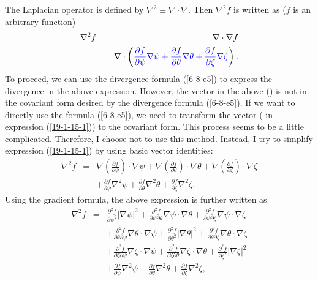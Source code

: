 \documentclass{article}
\newcommand{\tmcolor}[2]{{\color{#1}{#2}}}
\begin{document}
The Laplacian operator is defined by $\nabla^2 \equiv \nabla \cdot \nabla$.
Then $\nabla^2 f$ is written as ($f$ is an arbitrary function)
\begin{eqnarray}
  \nabla^2 f & = & \nabla \cdot \nabla f \nonumber\\
  & = & \nabla \cdot \left( \tmcolor{blue}{\frac{\partial f}{\partial \psi}
  \nabla \psi + \frac{\partial f}{\partial \theta} \nabla \theta +
  \frac{\partial f}{\partial \zeta} \nabla \zeta} \right) .  \label{19-1-15-1}
\end{eqnarray}
To proceed, we can use the divergence formula (\ref{6-8-e5}) to express the
divergence in the above expression. However, the vector in the above
(\tmcolor{blue}{blue term}) is not in the covariant form desired by the
divergence formula (\ref{6-8-e5}). If we want to directly use the formula
(\ref{6-8-e5}), we need to transform the vector (\tmcolor{blue}{blue term} in
expression (\ref{19-1-15-1})) to the covariant form. This process seems to be
a little complicated. Therefore, I choose not to use this method. Instead, I
try to simplify expression (\ref{19-1-15-1}) by using basic vector identities:
\begin{eqnarray}
  \nabla^2 f & = & \nabla \left( \frac{\partial f}{\partial \psi} \right)
  \cdot \nabla \psi + \nabla \left( \frac{\partial f}{\partial \theta} \right)
  \cdot \nabla \theta + \nabla \left( \frac{\partial f}{\partial \zeta}
  \right) \cdot \nabla \zeta \nonumber\\
  &  & + \frac{\partial f}{\partial \psi} \nabla^2 \psi + \frac{\partial
  f}{\partial \theta} \nabla^2 \theta + \frac{\partial f}{\partial \zeta}
  \nabla^2 \zeta . 
\end{eqnarray}
Using the gradient formula, the above expression is further written as
\begin{eqnarray}
  \nabla^2 f & = & \frac{\partial^2 f}{\partial \psi^2} | \nabla \psi |^2 +
  \frac{\partial^2 f}{\partial \psi \partial \theta} \nabla \psi \cdot \nabla
  \theta + \frac{\partial^2 f}{\partial \psi \partial \zeta} \nabla \psi \cdot
  \nabla \zeta \nonumber\\
  &  & + \frac{\partial^2 f}{\partial \theta \partial \psi} \nabla \theta
  \cdot \nabla \psi + \frac{\partial^2 f}{\partial \theta^2} | \nabla \theta
  |^2 + \frac{\partial^2 f}{\partial \theta \partial \zeta} \nabla \theta
  \cdot \nabla \zeta \nonumber\\
  &  & + \frac{\partial^2 f}{\partial \zeta \partial \psi} \nabla \zeta \cdot
  \nabla \psi + \frac{\partial^2 f}{\partial \zeta \partial \theta} \nabla
  \zeta \cdot \nabla \theta + \frac{\partial^2 f}{\partial \zeta^2} | \nabla
  \zeta |^2 \nonumber\\
  &  & + \frac{\partial f}{\partial \psi} \nabla^2 \psi + \frac{\partial
  f}{\partial \theta} \nabla^2 \theta + \frac{\partial f}{\partial \zeta}
  \nabla^2 \zeta, 
\end{eqnarray}
\end{document}
